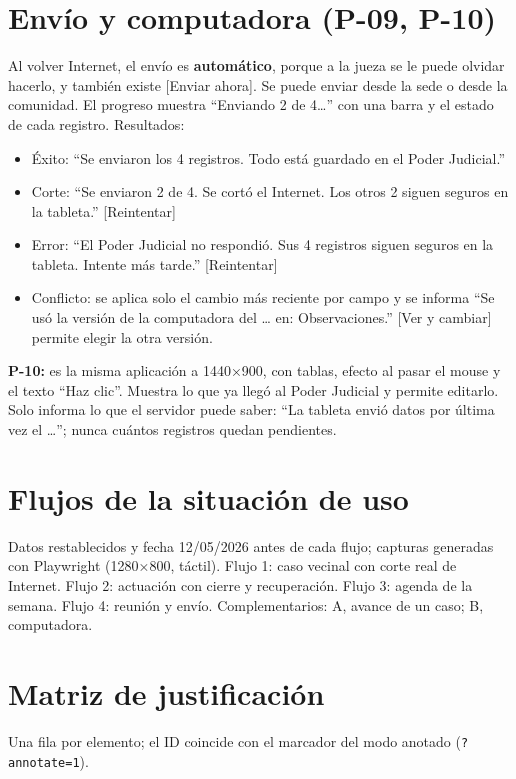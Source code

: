 \documentclass[11pt,a4paper]{article}
\begin{document}
\section{Envío y computadora (P-09, P-10)}
Al volver Internet, el envío es \textbf{automático}, porque a la jueza se le puede olvidar hacerlo, y también existe [Enviar ahora]. Se puede enviar desde la sede o desde la comunidad. El progreso muestra ``Enviando 2 de 4…'' con una barra y el estado de cada registro. Resultados:
\begin{itemize}\setlength\itemsep{0pt}
\item Éxito: ``Se enviaron los 4 registros. Todo está guardado en el Poder Judicial.''
\item Corte: ``Se enviaron 2 de 4. Se cortó el Internet. Los otros 2 siguen seguros en la tableta.'' [Reintentar]
\item Error: ``El Poder Judicial no respondió. Sus 4 registros siguen seguros en la tableta. Intente más tarde.'' [Reintentar]
\item Conflicto: se aplica solo el cambio más reciente por campo y se informa ``Se usó la versión de la computadora del … en: Observaciones.'' [Ver y cambiar] permite elegir la otra versión.
\end{itemize}
\textbf{P-10:} es la misma aplicación a 1440×900, con tablas, efecto al pasar el mouse y el texto ``Haz clic''. Muestra lo que ya llegó al Poder Judicial y permite editarlo. Solo informa lo que el servidor puede saber: ``La tableta envió datos por última vez el …''; nunca cuántos registros quedan pendientes.

\section{Flujos de la situación de uso}
Datos restablecidos y fecha 12/05/2026 antes de cada flujo; capturas generadas con Playwright (1280×800, táctil). Flujo 1: caso vecinal con corte real de Internet. Flujo 2: actuación con cierre y recuperación. Flujo 3: agenda de la semana. Flujo 4: reunión y envío. Complementarios: A, avance de un caso; B, computadora.


\section{Matriz de justificación}
Una fila por elemento; el ID coincide con el marcador del modo anotado (\texttt{?annotate=1}).

\end{document}
